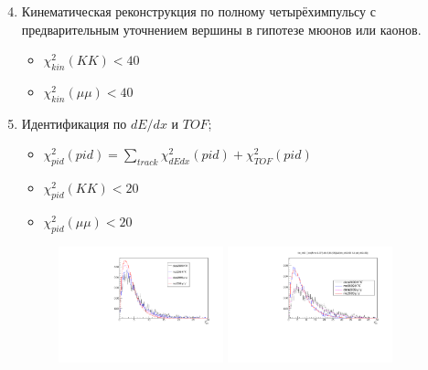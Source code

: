\documentclass[unicode]{beamer}
\begin{document}
\begin{frame}
	\begin{enumerate}
			\setcounter{enumi}{3}
	\item Кинематическая реконструкция по полному четырёхимпульсу с
		предварительным уточнением вершины в гипотезе мюонов или каонов.
		\begin{itemize}
			\item $\chi^2_{kin}(KK) < 40$
			\item $\chi^2_{kin}(\mu\mu) < 40$
		\end{itemize}
		\item Идентификация по $dE/dx$ и  $TOF$;
			\renewcommand{\arraystretch}{1.8}
			\begin{itemize}
				\item $\chi^2_{pid}(pid) = \sum\limits_{track}^{}\chi^2_{dEdx}(pid) + \chi^2_{TOF}(pid)$
				\item $\chi^2_{pid}(KK) < 20$
				\item $\chi^2_{pid}(\mu\mu) < 20$
				\end{itemize}

			\begin{figure}
			\begin{center}
				\includegraphics[width=0.45\textwidth]{fig/pid_chi2-09.pdf} \hfill
				\includegraphics[width=0.45\textwidth]{fig/kin_chi2-09.pdf}
			\end{center}
			\end{figure}
		\end{enumerate}

\end{frame}
\end{document}

